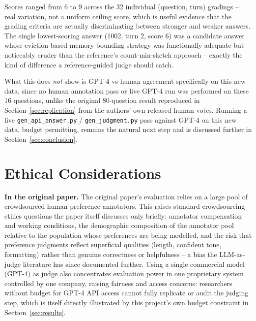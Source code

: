 \documentclass[11pt,twocolumn]{article}
\begin{document}
Scores ranged from 6 to 9 across the 32 individual (question, turn) gradings -- real variation,
not a uniform ceiling score, which is useful evidence that the grading criteria are actually
discriminating between stronger and weaker answers. The single lowest-scoring answer (1002, turn 2,
score 6) was a candidate answer whose eviction-based memory-bounding strategy was functionally
adequate but noticeably cruder than the reference's count-min-sketch approach -- exactly the kind of
difference a reference-guided judge should catch.

What this does \emph{not} show is GPT-4-vs-human agreement specifically on this new data, since
no human annotation pass or live GPT-4 run was performed on these 16 questions, unlike the original
80-question result reproduced in Section~\ref{sec:replication} from the authors' own released human
votes. Running a live \texttt{gen\_api\_answer.py} / \texttt{gen\_judgment.py} pass against GPT-4 on
this new data, budget permitting, remains the natural next step and is discussed further in
Section~\ref{sec:conclusion}.

\section{Ethical Considerations}
\label{sec:ethics}

\textbf{In the original paper.} The original paper's evaluation relies on a large pool of
crowdsourced human preference annotators. This raises standard crowdsourcing ethics questions the
paper itself discusses only briefly: annotator compensation and working conditions, the
demographic composition of the annotator pool relative to the population whose preferences are
being modelled, and the risk that preference judgments reflect superficial qualities (length,
confident tone, formatting) rather than genuine correctness or helpfulness -- a bias the
LLM-as-judge literature has since documented further. Using a single commercial model (GPT-4) as
judge also concentrates evaluation power in one proprietary system controlled by one company,
raising fairness and access concerns: researchers without budget for GPT-4 API access cannot fully
replicate or audit the judging step, which is itself directly illustrated by this project's own
budget constraint in Section~\ref{sec:results}.
\end{document}
